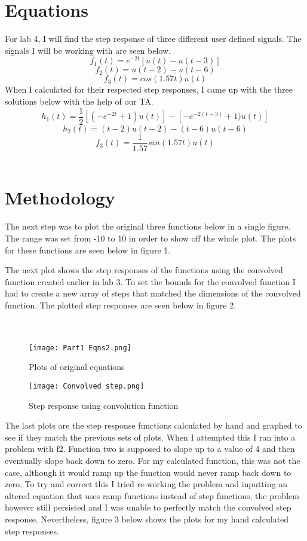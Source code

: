 \documentclass[12pt]{report}
\begin{document}
\section{Equations}
\hspace{\parindent}For lab 4, I will find the step response of three different user defined signals. The signals I will be working with are seen below.
\[f_1(t) = e^{-2t}[u(t) - u(t - 3)]\]
\[f_2(t) = u(t - 2) - u(t - 6)\]
\[f_3(t) = cos(1.57t)u(t)\]
\hspace{\parindent}When I calculated for their respected step responses, I came up with the three solutions below with the help of our TA. 
\[h_1(t) = \frac{1}{2}[(-e^{-2t} + 1)u(t)] - [-e^{-2(t - 3)} + 1)u(t)]\]
\[h_2(t) = (t - 2)u(t - 2) - (t - 6)u(t - 6)\]
\[f_3(t) = \frac{1}{1.57}sin(1.57t)u(t)\]
\\
\section{Methodology}
\hspace{\parindent}The next step was to plot the original three functions below in a single figure. The range was set from -10 to 10 in order to show off the whole plot. The plots for these functions are seen below in figure 1. \par
\hspace{\parindent}The next plot shows the step responses of the functions using the convolved function created earlier in lab 3. To set the bounds for the convolved function I had to create a new array of steps that matched the dimensions of the convolved function. The plotted step responses are seen below in figure 2.
\\\\\\
\begin{figure}[h!]
    \centering
    \texttt{[image: Part1 Eqns2.png]}
    \caption{Plots of original equations}
    \label{Figure x:}
\end{figure}
\begin{figure}[h!]
    \centering
    \texttt{[image: Convolved step.png]}
    \caption{Step response using convolution function}
    \label{Figure x:}
\end{figure}
\hspace{\parindent}The last plots are the step response functions calculated by hand and graphed to see if they match the previous sets of plots. When I attempted this I ran into a problem with f2. Function two is supposed to slope up to a value of 4 and then eventually slope back down to zero. For my calculated function, this was not the case, although it would ramp up the function would never ramp back down to zero. To try and correct this I tried re-working the problem and inputting an altered equation that uses ramp functions instead of step functions, the problem however still persisted and I was unable to perfectly match the convolved step response. Nevertheless, figure 3 below shows the plots for my hand calculated step responses.
\end{document}
